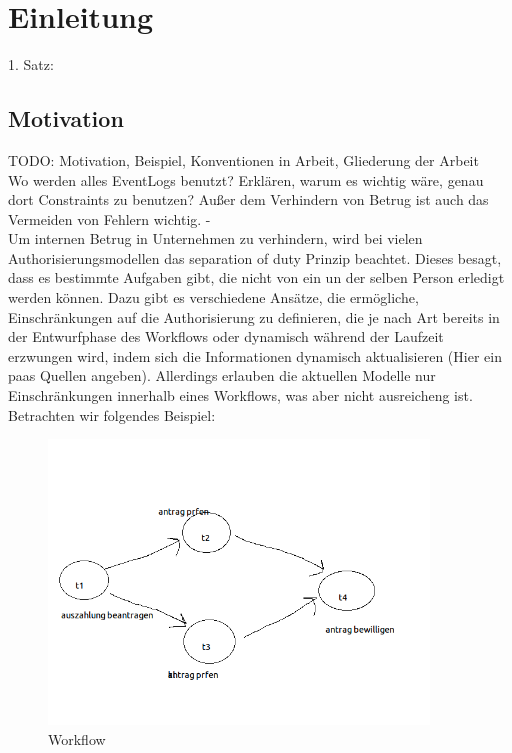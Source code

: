 
\chapter{Einleitung} %

\label{Chapter1} %


1. Satz:\\


\section{Motivation}
TODO: Motivation, Beispiel, Konventionen in Arbeit, Gliederung der Arbeit\\
Wo werden alles EventLogs benutzt? Erklären, warum es wichtig wäre, genau dort Constraints zu benutzen? Außer dem Verhindern von Betrug ist auch das Vermeiden von Fehlern wichtig. -\\
Um internen Betrug in Unternehmen zu verhindern, wird bei vielen Authorisierungsmodellen das separation of duty Prinzip beachtet. Dieses besagt, dass es bestimmte Aufgaben gibt, die nicht von ein un der selben Person erledigt werden können. Dazu gibt es verschiedene Ansätze, die ermögliche, Einschränkungen auf die Authorisierung zu definieren, die je nach Art bereits in der Entwurfphase des Workflows oder dynamisch während der Laufzeit erzwungen wird, indem sich die Informationen dynamisch aktualisieren (Hier ein paas Quellen angeben). Allerdings erlauben die aktuellen Modelle nur Einschränkungen innerhalb eines Workflows, was aber nicht ausreicheng ist.\\
Betrachten wir folgendes Beispiel:\\

\begin{figure}[ht]
	\centering
  \includegraphics[width=0.9\textwidth]{Figures/Workflow}
	\caption{Workflow}
	\label{fig:Workflow}
\end{figure}

